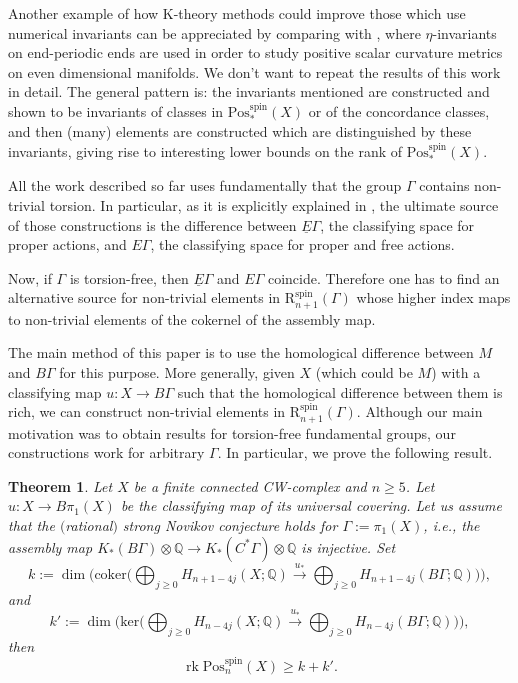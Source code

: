 \documentclass[10pt,a4paper]{amsart}
\numberwithin{equation}{section}
\newtheorem{Theorem}{Theorem}[section]
\def\QQ{\ensuremath{\mathbb{Q}}}
\DeclareMathOperator{\spin}{spin}
\begin{document}
 Another example of how K-theory methods could improve those which use
 numerical invariants can be appreciated by comparing
 \cite{PiazzaSchickZenobi_psc} with \cite{KazarasRubermanSaveliev}, where
 $\eta$-invariants on end-periodic ends are used in order to study positive
 scalar curvature metrics on even dimensional manifolds. We don't want
 to repeat the results of this work in detail. The general pattern is: the
 invariants mentioned are constructed and shown to be invariants of classes
 in $\mathrm{Pos}_*^{\spin}(X)$ or of the concordance classes, and then (many)
 elements are constructed which are distinguished by these invariants,
 giving rise to interesting lower bounds on the rank of
 $\mathrm{Pos}^{\spin}_*(X)$.

 All the work described so far uses fundamentally that
 the group
 $\Gamma$ contains non-trivial torsion. In particular, as it is explicitly
 explained in
 \cite{XieYuZeidler}, the ultimate source of those constructions is the
 difference between $\underline{E}\Gamma$, the classifying space for proper
 actions, and $E\Gamma$, the classifying space for proper and free
 actions.

 Now, if $\Gamma$ is torsion-free, then $\underline{E}\Gamma$ and $E\Gamma$
 coincide. Therefore one has to find an alternative source for non-trivial
 elements in $\mathrm{R}^{\spin}_{n+1}(\Gamma)$ whose higher index maps to
 non-trivial elements of the cokernel of the assembly map.

 The main method of this paper is to use the homological difference between
 $M$ and $B\Gamma$ for this purpose. More generally, given $X$ (which could
 be $M$) with a classifying map $u\colon X\to B\Gamma$ such that the homological
 difference between them is rich, we can construct non-trivial elements in
 $\mathrm{R}^{\spin}_{n+1}(\Gamma)$. Although our main motivation was to
 obtain results for torsion-free fundamental groups, our constructions
 work for arbitrary $\Gamma$. In particular, we prove the following
 result.


 \begin{Theorem}\label{lower-bound} Let $X$ be a finite connected CW-complex
 and $n\ge 5$. Let $u\colon X\to B\pi_1(X)$ be the classifying map of its universal covering.
 Let us assume that the $($rational$)$ strong Novikov conjecture holds for
 $\Gamma:=\pi_1(X)$, i.e., the assembly map $K_*(B\Gamma)\otimes\QQ\to
 K_*(C^*\Gamma)\otimes\QQ$ is injective. Set
 \[k:= \dim\bigg(\mathrm{coker}\bigg(\bigoplus_{j\geq0}H_{n+1-4j}(X;\QQ)\xrightarrow{u_*}\bigoplus_{j\geq0}H_{n+1-4j}(B\Gamma;\QQ)\bigg)\bigg), \]
 and
 \[k':= \dim\bigg(\mathrm{ker}\bigg(\bigoplus_{j\geq0}H_{n-4j}(X;\QQ)\xrightarrow{u_*}\bigoplus_{j\geq0}H_{n-4j}(B\Gamma;\QQ)\bigg)\bigg),\]
 then
 \[\operatorname{rk} \mathrm{Pos}^{\spin}_{n}(X)\geq k+k'.\]
 \end{Theorem}
\end{document}
